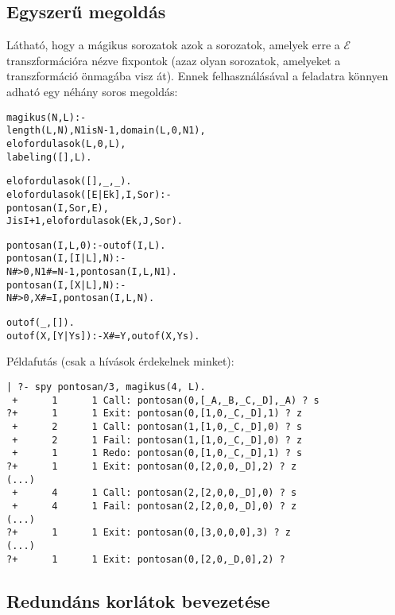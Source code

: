 \subsection{Egyszerű \clpfd megoldás}

Látható, hogy a mágikus sorozatok azok a sorozatok, amelyek erre a $\mathcal{E}$
transzformációra nézve fixpontok (azaz olyan sorozatok, amelyeket a transzformáció
önmagába visz át). Ennek felhasználásával a feladatra könnyen adható egy néhány
soros \clpfd megoldás:

\begin{alltt}
% Az L lista egy N hosszúságú mágikus sorozat.
magikus(N, L) :-
        length(L, N), N1 is N-1, domain(L, 0, N1),
        elofordulasok(L, 0, L),
        labeling([], L).             % most felesleges

% elofordulasok([E\(_\cd{i}\), E\(_\cd{i+1}\), \ldots], i, Sor): Sor-ban az i
% szám E\(_\cd{i}\)-szer, az i+1 szám E\(_\cd{i+1}\)-szer stb. fordul elő.
% Ez a predikátum valósítja meg a fenti előfordulás-sorozat transzformációt
elofordulasok([], _, _).
elofordulasok([E|Ek], I, Sor) :-
        pontosan(I, Sor, E), 
        J is I+1, elofordulasok(Ek, J, Sor).

% pontosan(I, L, E): Az I szám L-ben E-szer fordul elő.
pontosan(I, L, 0) :- outof(I, L).
pontosan(I, [I|L], N) :- 
        N #> 0, N1 #= N-1, pontosan(I, L, N1).
pontosan(I, [X|L], N) :- 
        N #> 0, X #\bs= I, pontosan(I, L, N).

% outof(I, L): Az I szám L-ben nem fordul elő.
outof(_, []).
outof(X, [Y|Ys]) :- X #\bs= Y, outof(X, Ys).
\end{alltt}

Példafutás (csak a  hívások érdekelnek minket):

\begin{verbatim}
| ?- spy pontosan/3, magikus(4, L).
 +      1      1 Call: pontosan(0,[_A,_B,_C,_D],_A) ? s
?+      1      1 Exit: pontosan(0,[1,0,_C,_D],1) ? z
 +      2      1 Call: pontosan(1,[1,0,_C,_D],0) ? s
 +      2      1 Fail: pontosan(1,[1,0,_C,_D],0) ? z
 +      1      1 Redo: pontosan(0,[1,0,_C,_D],1) ? s
?+      1      1 Exit: pontosan(0,[2,0,0,_D],2) ? z
(...)
 +      4      1 Call: pontosan(2,[2,0,0,_D],0) ? s
 +      4      1 Fail: pontosan(2,[2,0,0,_D],0) ? z
(...)
?+      1      1 Exit: pontosan(0,[3,0,0,0],3) ? z
(...)
?+      1      1 Exit: pontosan(0,[2,0,_D,0],2) ?
\end{verbatim}

\subsection{Redundáns korlátok bevezetése}

